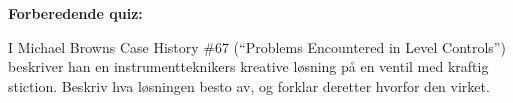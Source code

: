 \vfil \eject

\noindent
{\bf Forberedende quiz:}

I Michael Browns Case History \#67 (``Problems Encountered in Level Controls'') beskriver han en instrumentteknikers kreative løsning på en ventil med kraftig stiction. Beskriv hva løsningen besto av, og forklar deretter hvorfor den virket.




